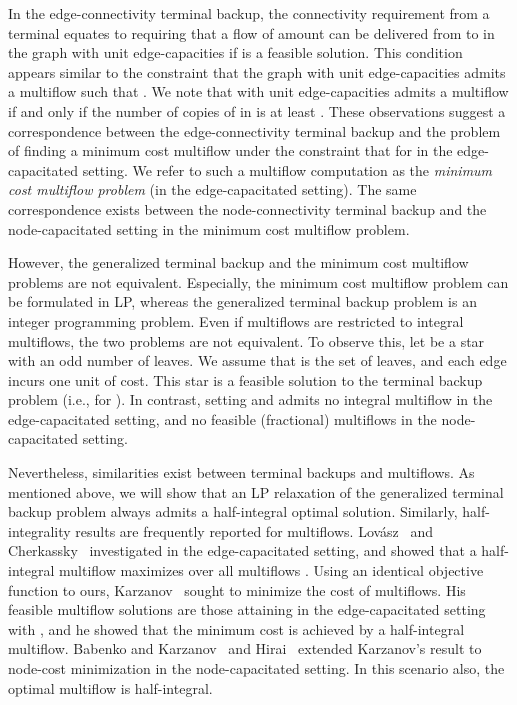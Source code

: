 \documentclass{article}
\begin{document}
In the edge-connectivity terminal backup, 
the connectivity requirement from a terminal  equates to requiring that
a flow of amount  can be delivered from  to 
in the graph  with unit edge-capacities if  is a feasible solution.
This condition appears similar to the constraint that 
the graph  with unit edge-capacities
admits a multiflow 
such that .
We note that  with unit edge-capacities admits a multiflow 
if and only if
the number of copies of  in  is at least .
These observations suggest a correspondence between the edge-connectivity terminal backup
and the problem of finding a minimum cost multiflow 
under the constraint that 
 for  in the edge-capacitated setting.
We refer to such a multiflow computation as the \emph{minimum cost multiflow problem}
(in the edge-capacitated setting).
The same correspondence exists between
the node-connectivity terminal backup and the 
node-capacitated setting in the minimum cost multiflow problem.

However,
the generalized terminal backup and the minimum cost multiflow problems are not equivalent.
Especially, the minimum cost multiflow problem can be formulated in LP, whereas 
the generalized terminal backup problem is an integer programming problem.
Even if multiflows are restricted to integral multiflows, 
the two problems are not equivalent.
To observe this, let  be a star with an odd number of leaves. 
We assume that  is the set of leaves,
and each edge incurs one unit of cost.
This star is a feasible solution 
to the terminal backup problem (i.e.,  for ).
In contrast, setting  and 
admits no integral multiflow in the edge-capacitated setting, and
no feasible (fractional) multiflows in the node-capacitated setting.

Nevertheless,
similarities exist between terminal backups and multiflows.
As mentioned above, we will show that an LP relaxation of the generalized terminal backup problem
always admits a half-integral optimal solution.
Similarly, half-integrality results are frequently reported for multiflows.
Lov\'asz~\cite{Lovasz76} and Cherkassky~\cite{Cherkasskky77} 
investigated  in the edge-capacitated setting,
and showed that a half-integral multiflow maximizes  over all 
multiflows . Using an identical objective function to ours,
Karzanov~\cite{Karzanov94,Karzanov79} sought to
minimize the cost of multiflows.
His feasible multiflow solutions are those attaining 
in the edge-capacitated setting with ,
and he showed that the minimum cost is achieved by a half-integral multiflow.
Babenko and Karzanov~\cite{BabenkoK12} and Hirai~\cite{Hirai13} extended 
Karzanov's result to node-cost minimization in the node-capacitated setting.
In this scenario also, the optimal multiflow is half-integral.
\end{document}

